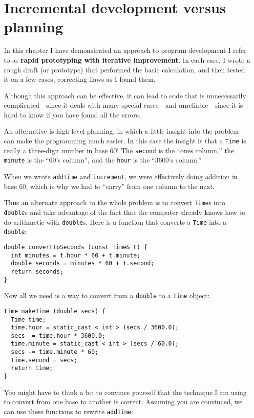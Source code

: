 \section{Incremental development versus planning}

In this chapter I have demonstrated an approach to program
development I refer to as {\bf rapid prototyping with iterative
improvement}.  In each case, I wrote a rough draft (or prototype)
that performed the basic calculation, and then tested it on
a few cases, correcting flaws as I found them.

Although this approach can be effective, it can lead to code
that is unnecessarily complicated---since it deals with many
special cases---and unreliable---since it is hard to know if
you have found all the errors.

An alternative is high-level planning, in which a little insight
into the problem can make the programming much easier.  In
this case the insight is that a {\tt Time} is really a three-digit
number in base 60!  The {\tt second} is the ``ones column,''
the {\tt minute} is the ``60's column'', and the {\tt hour}
is the ``3600's column.''

When we wrote {\tt addTime} and {\tt increment}, we were effectively
doing addition in base 60, which is why we had to ``carry'' from one
column to the next.


Thus an alternate approach to the whole problem is to convert
{\tt Time}s into {\tt double}s and take advantage of the fact that
the computer already knows how to do arithmetic with {\tt double}s.
Here is a function that converts a {\tt Time} into a {\tt double}:

\begin{verbatim}
double convertToSeconds (const Time& t) {
  int minutes = t.hour * 60 + t.minute;
  double seconds = minutes * 60 + t.second;
  return seconds;
}
\end{verbatim}
%
Now all we need is a way to convert from a {\tt double}
to a {\tt Time} object:

\begin{verbatim}
Time makeTime (double secs) {
  Time time;
  time.hour = static_cast < int > (secs / 3600.0);
  secs -= time.hour * 3600.0;
  time.minute = static_cast < int > (secs / 60.0);
  secs -= time.minute * 60;
  time.second = secs;
  return time;
}
\end{verbatim}
%
You might have to think a bit to convince yourself that the technique
I am using to convert from one base to another is correct.  Assuming
you are convinced, we can use these functions to rewrite {\tt addTime}:

